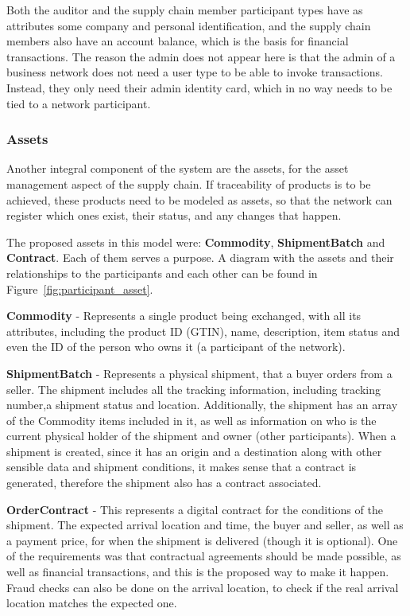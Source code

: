 Both the auditor and the supply chain member participant types have as attributes some company and personal identification, and the supply chain members also have an account balance, which is the basis for financial transactions.  The reason the admin does not appear here is that the admin of a business network does not need a user type to be able to invoke transactions. Instead, they only need their admin identity card, which in no way needs to be tied to a network participant.

\subsubsection*{Assets}%

Another integral component of the system are the assets, for the asset management aspect of the supply chain. If traceability of products is to be achieved, these products need to be modeled as assets, so that the network can register which ones exist, their status, and any changes that happen.

The proposed assets in this model were: \textbf{Commodity}, \textbf{ShipmentBatch} and \textbf{Contract}. Each of them serves a purpose. A diagram with the assets and their relationships to the participants and each other can be found in Figure~\ref{fig:participant_asset}.

\par \textbf{Commodity} - Represents a single product being exchanged, with all its attributes, including the product ID (GTIN), name, description, item status and even the ID of the person who owns it (a participant of the network).
\par \textbf{ShipmentBatch} - Represents a physical shipment, that a buyer orders from a seller. The shipment includes all the tracking information, including tracking number,a shipment status and location. Additionally, the shipment  has an array of the Commodity items included in it, as well as information on who is the current physical holder of the shipment and owner (other participants). When a shipment is created, since it has an origin and a destination along with other sensible data and shipment conditions, it makes sense that a contract is generated, therefore the shipment also has a contract associated.
\par \textbf{OrderContract} - This represents a digital contract for the conditions of the shipment. The expected arrival location and time, the buyer and seller, as well as a payment price, for when the shipment is delivered (though it is optional). One of the requirements was that contractual agreements should be made possible, as well as financial transactions, and this is the proposed way to make it happen. Fraud checks can also be done on the arrival location, to check if the real arrival location matches the expected one.

